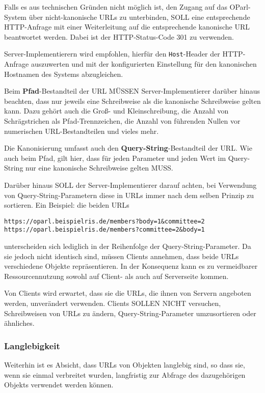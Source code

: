 \documentclass[,a4paper]{article}
\begin{document}
Falls es aus technischen Gründen nicht möglich ist, den Zugang auf das
OParl-System über nicht-kanonische URLs zu unterbinden, SOLL eine
entsprechende HTTP-Anfrage mit einer Weiterleitung auf die entsprechende
kanonische URL beantwortet werden. Dabei ist der HTTP-Status-Code 301 zu
verwenden.

Server-Implementierern wird empfohlen, hierfür den \texttt{Host}-Header
der HTTP-Anfrage auszuwerten und mit der konfigurierten Einstellung für
den kanonischen Hostnamen des Systems abzugleichen.

Beim \textbf{Pfad}-Bestandteil der URL MÜSSEN Server-Implementierer
darüber hinaus beachten, dass nur jeweils eine Schreibweise als die
kanonische Schreibweise gelten kann. Dazu gehört auch die Groß- und
Kleinschreibung, die Anzahl von Schrägstrichen als Pfad-Trennzeichen,
die Anzahl von führenden Nullen vor numerischen URL-Bestandteilen und
vieles mehr.

Die Kanonisierung umfasst auch den \textbf{Query-String}-Bestandteil der
URL. Wie auch beim Pfad, gilt hier, dass für jeden Parameter und jeden
Wert im Query-String nur eine kanonische Schreibweise gelten MUSS.

Darüber hinaus SOLL der Server-Implementierer darauf achten, bei
Verwendung von Query-String-Parametern diese in URLs immer nach dem
selben Prinzip zu sortieren. Ein Beispiel: die beiden URLs

\begin{verbatim}
https://oparl.beispielris.de/members?body=1&committee=2
https://oparl.beispielris.de/members?committee=2&body=1
\end{verbatim}

unterscheiden sich lediglich in der Reihenfolge der
Query-String-Parameter. Da sie jedoch nicht identisch sind, müssen
Clients annehmen, dass beide URLs verschiedene Objekte repräsentieren.
In der Konsequenz kann es zu vermeidbarer Ressourcennutzung sowohl auf
Client- als auch auf Serverseite kommen.

Von Clients wird erwartet, dass sie die URLs, die ihnen von Servern
angeboten werden, unverändert verwenden. Clients SOLLEN NICHT versuchen,
Schreibweisen von URLs zu ändern, Query-String-Parameter umzusortieren
oder ähnliches.

\subsubsection{Langlebigkeit}\label{langlebigkeit}

Weiterhin ist es Absicht, dass URLs von Objekten langlebig sind, so dass
sie, wenn sie einmal verbreitet wurden, langfristig zur Abfrage des
dazugehörigen Objekts verwendet werden können.
\end{document}
